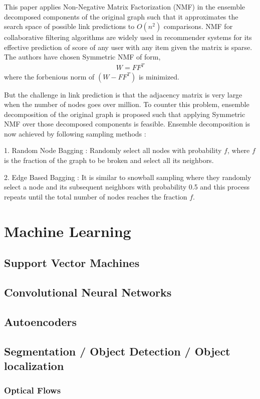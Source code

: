 This paper applies Non-Negative Matrix Factorization (NMF) in the ensemble decomposed components of the original graph such that it approximates the search space of possible link predictions to $O(n^2)$ comparisons. NMF for collaborative filtering algorithms are widely used in recommender systems for its effective prediction of score of any user with any item given the matrix is sparse. The authors have chosen Symmetric NMF of form, 
\begin{align*}
W = FF^T
\end{align*}
where the forbenious norm of $(W - FF^T)$ is minimized.

But the challenge in link prediction is that the adjacency matrix is very large when the number of nodes goes over million. To counter this problem, ensemble decomposition of the original graph is proposed such that applying Symmetric NMF over those decomposed components is feasible. Ensemble decomposition is now achieved by following sampling methods :

1. Random Node Bagging : Randomly select all nodes with probability $f$, where $f$ is the fraction of the graph to be broken and select all its neighbors.

2. Edge Based Bagging : It is similar to snowball sampling where they randomly select a node and its subsequent neighbors with probability 0.5 and this process repeats until the total number of nodes reaches the fraction $f$.

\section{\textbf{Machine Learning}}

\subsection{\textbf{Support Vector Machines}}
\subsection{\textbf{Convolutional Neural Networks}}
\subsection{\textbf{Autoencoders}}
\subsection{\textbf{Segmentation /  Object Detection / Object localization}}

\subsubsection{\textbf{Optical Flows}}